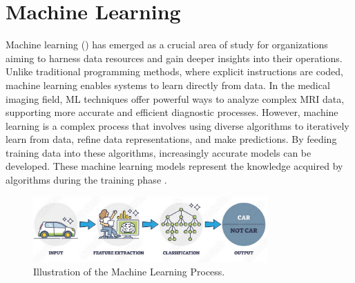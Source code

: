\section{Machine Learning}
\label{sec:ml}
Machine learning () has emerged as a crucial area of study for organizations aiming to harness data resources and gain deeper insights into their operations. Unlike traditional programming methods, where explicit instructions are coded, machine learning enables systems to learn directly from data. In the medical imaging field, ML techniques offer powerful ways to analyze complex MRI data, supporting more accurate and efficient diagnostic processes. However, machine learning is a complex process that involves using diverse algorithms to iteratively learn from data, refine data representations, and make predictions. By feeding training data into these algorithms, increasingly accurate models can be developed. These machine learning models represent the knowledge acquired by algorithms during the training phase \cite{hurwitz2018mlfd}.

\begin{figure}[H]
  \centering
  \includegraphics[width=0.8\textwidth]{Images/Chapter1/ml.png}
  \caption{Illustration of the Machine Learning Process. \cite{alltius2025deeplearning}}
  \label{fig:ml}
\end{figure}



